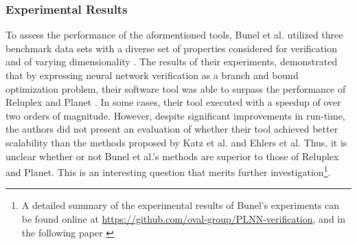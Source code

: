 \documentclass[10pt,conference]{IEEEtran}
\begin{document}
\subsubsection{Experimental Results}
To assess the performance of the aformentioned tools, Bunel et al. utilized three benchmark data sets with a diverse set of properties considered for verification and of varying dimensionality \cite{BunelPiecewise2017}. The results of their experiments, demonstrated that by expressing neural network verification as a branch and bound optimization problem, their software tool was able to surpass the performance of Reluplex and Planet \cite{BunelPiecewise2017}. In some cases, their tool executed with a speedup of over two orders of magnitude. However, despite significant improvements in run-time, the authors did not present an evaluation of whether their tool achieved better scalability than the methods proposed by Katz et al. and Ehlers et al. Thus, it is unclear whether or not Bunel et al.'s methods are superior to those of Reluplex and Planet. This is an interesting question that merits further investigation\footnote{A detailed summary of the experimental results of Bunel's experiments can be found online at \url{https://github.com/oval-group/PLNN-verification}, and in the following paper \cite{BunelPiecewise2017}}.
\end{document}
